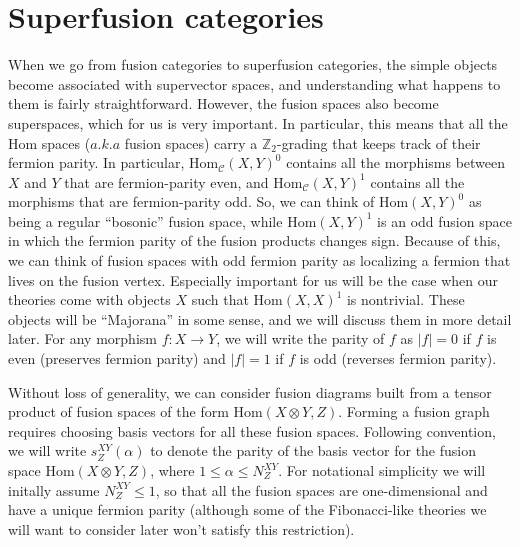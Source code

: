 \documentclass[12pt,a4paper]{article}
\newcommand{\tp}{\otimes}
\newcommand{\ra}{\rightarrow}
\newcommand{\zt}{\mathbb{Z}_2}
\newcommand{\mcc}{\mathcal{C}}
\newcommand{\Hom}{\text{Hom}}
\newcommand{\dave}[1]{{\color{ao(english)}\footnotesize{(DA) #1}}}
\newcommand{\ethan}[1]{{\color{amethyst}\footnotesize{(EL) #1}}}
\begin{document}
\section{Superfusion categories} 


When we go from fusion categories to superfusion categories, the simple objects become associated with supervector spaces, and understanding what happens to them is fairly straightforward. 
However, the fusion spaces also become superspaces, which for us is very important. In particular, this means that all the Hom spaces ($a.k.a$ fusion spaces) carry a $\zt$-grading that keeps track of their fermion parity. In particular, $\Hom_\mcc(X,Y)^0$ contains all the morphisms between $X$ and $Y$ that are fermion-parity even, and $\Hom_\mcc(X,Y)^1$ contains all the morphisms that are fermion-parity odd. So, we can think of $\Hom(X,Y)^0$ as being a regular ``bosonic'' fusion space, while $\Hom(X,Y)^1$ is an odd fusion space in which the fermion parity of the fusion products changes sign. Because of this, we can think of fusion spaces with odd fermion parity as localizing a fermion that lives on the fusion vertex. Especially important for us will be the case when our theories come with objects $X$ such that $\Hom(X,X)^1$ is nontrivial. These objects will be ``Majorana'' in some sense, and we will discuss them in more detail later. 
For any morphism $f : X\ra Y$, we will write the parity of $f$ as $|f| = 
0$ if $f$ is even (preserves fermion parity) and $|f| = 1$ if $f$ is odd (reverses fermion parity). 

Without loss of generality, we can consider fusion diagrams built from a tensor product of fusion spaces of the form $\Hom(X\tp Y,Z)$. Forming a fusion graph requires choosing basis vectors for all these fusion spaces. Following convention, we will write $s^{XY}_Z(\alpha)$ to denote the parity of the basis vector for the fusion space $\Hom(X\tp Y,Z)$, where $1\leq\alpha\leq N^{XY}_Z$. For notational simplicity we will initally assume $N^{XY}_Z \leq 1$, so that all the fusion spaces are one-dimensional and have a unique fermion parity (although some of the Fibonacci-like theories we will want to consider later won't satisfy this restriction). 
\end{document}
